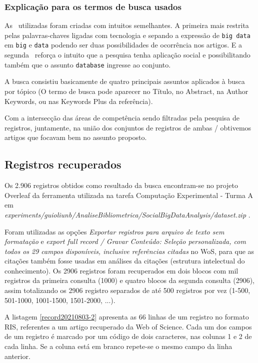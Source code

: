 \subsubsection{Explicação para os termos de busca usados\label{MASSA:query}}

As \querys\ utilizadas foram criadas com intuitos semelhantes. A primeira mais restrita pelas palavras-chaves ligadas com tecnologia e sepando a expressão de \texttt{big data} em \texttt{big} e \texttt{data} podendo ser duas possibilidades de ocorrência nos artigos. E a segunda \query\ reforça o intuito que a pesquisa tenha aplicação social e possibilitando também que o assunto  \texttt{database} ingresse ao conjunto.

A busca consistiu basicamente de quatro principais  assuntos aplicados à busca por tópico (O termo de busca pode aparecer no Título, no Abstract, na Author Keywords, ou nas Keywords Plus da referência).

Com a intersecção das áreas de competência sendo filtradas pela pesquisa de registros, juntamente, na união dos conjuntos de registros de ambas \querys/ obtivemos artigos que focavam bem no assunto proposto.

\subsection{Registros recuperados}

Os 2.906 registros obtidos como resultado da busca encontram-se no projeto Overleaf da ferramenta utilizada na tarefa Computação Experimental - Turma A em \textit{experiments/guioliunb/AnaliseBibliometrica/SocialBigDataAnalysis/dataset.zip} . 

Foram utilizadas as opções \textit{Exportar registros para arquivo de texto sem formatação} e \textit{export full record / Gravar Conteúdo: Seleção personalizada, com todos os 29 campos disponíveis, inclusive referências citadas} no WoS, para que as citações também fosse usadas em análises da citações (estrutura intelectual do conhecimento). Os 2906 registros foram recuperados em dois blocos com mil registros da primeira consulta (1000) e quatro blocos da segunda consulta (2906), assim totalizando os 2906 registro  separados de até 500 registros por vez (1-500, 501-1000, 1001-1500, 1501-2000, ...).

A listagem \ref{record20210803-2} apresenta as 66 linhas de um registro no formato RIS, referentes a um artigo recuperado da Web of Science. Cada um dos campos de um registro é marcado por um código de dois caracteres, nas colunas 1 e 2 de cada linha. Se a coluna está em branco repete-se o mesmo campo da linha anterior.


